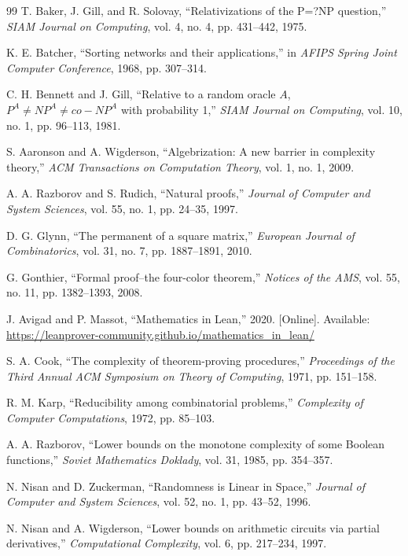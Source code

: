 \documentclass[12pt]{article}
\theoremstyle{definition}
\theoremstyle{definition}
\theoremstyle{remark}
\theoremstyle{remark}
\begin{document}
\begin{thebibliography}{99}
T. Baker, J. Gill, and R. Solovay, ``Relativizations of the P=?NP question,'' \emph{SIAM Journal on Computing}, vol. 4, no. 4, pp. 431--442, 1975.

K. E. Batcher, ``Sorting networks and their applications,'' in \emph{AFIPS Spring Joint Computer Conference}, 1968, pp. 307--314.

C. H. Bennett and J. Gill, ``Relative to a random oracle $A$, $P^A \neq NP^A \neq co-NP^A$ with probability 1,'' \emph{SIAM Journal on Computing}, vol. 10, no. 1, pp. 96--113, 1981.

S. Aaronson and A. Wigderson, ``Algebrization: A new barrier in complexity theory,'' \emph{ACM Transactions on Computation Theory}, vol. 1, no. 1, 2009.

A. A. Razborov and S. Rudich, ``Natural proofs,'' \emph{Journal of Computer and System Sciences}, vol. 55, no. 1, pp. 24--35, 1997.

D. G. Glynn, ``The permanent of a square matrix,'' \emph{European Journal of Combinatorics}, vol. 31, no. 7, pp. 1887--1891, 2010.

G. Gonthier, ``Formal proof--the four-color theorem,'' \emph{Notices of the AMS}, vol. 55, no. 11, pp. 1382--1393, 2008.

J. Avigad and P. Massot, ``Mathematics in Lean,'' 2020. [Online]. Available: \url{https://leanprover-community.github.io/mathematics_in_lean/}

S. A. Cook, ``The complexity of theorem-proving procedures,'' \emph{Proceedings of the Third Annual ACM Symposium on Theory of Computing}, 1971, pp. 151--158.

R. M. Karp, ``Reducibility among combinatorial problems,'' \emph{Complexity of Computer Computations}, 1972, pp. 85--103.

A. A. Razborov, ``Lower bounds on the monotone complexity of some Boolean functions,'' \emph{Soviet Mathematics Doklady}, vol. 31, 1985, pp. 354--357.

N. Nisan and D. Zuckerman, ``Randomness is Linear in Space,'' \emph{Journal of Computer and System Sciences}, vol. 52, no. 1, pp. 43--52, 1996.

N. Nisan and A. Wigderson, ``Lower bounds on arithmetic circuits via partial derivatives,'' \emph{Computational Complexity}, vol. 6, pp. 217--234, 1997.


\end{thebibliography}
\end{document}
